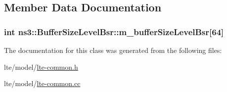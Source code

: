 \subsection{Member Data Documentation}
\subsubsection[{\texorpdfstring{m\+\_\+buffer\+Size\+Level\+Bsr}{m_bufferSizeLevelBsr}}]{\setlength{\rightskip}{0pt plus 5cm}int ns3\+::\+Buffer\+Size\+Level\+Bsr\+::m\+\_\+buffer\+Size\+Level\+Bsr\mbox{[}64\mbox{]}\hspace{0.3cm}{\ttfamily [static]}}\hypertarget{classns3_1_1BufferSizeLevelBsr_a154cb5c470ad610ddd743e569a1cf02d}{}\label{classns3_1_1BufferSizeLevelBsr_a154cb5c470ad610ddd743e569a1cf02d}


The documentation for this class was generated from the following files\+:\begin{DoxyCompactItemize}
\item 
lte/model/\hyperlink{lte-common_8h}{lte-\/common.\+h}\item 
lte/model/\hyperlink{lte-common_8cc}{lte-\/common.\+cc}\end{DoxyCompactItemize}
